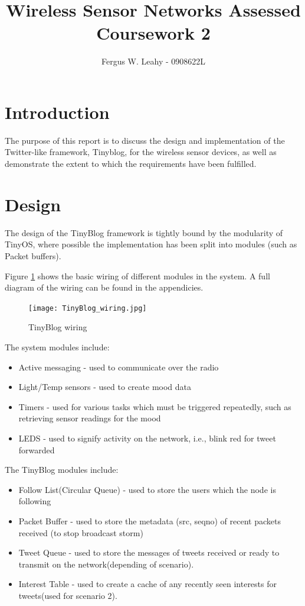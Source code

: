 \documentclass{article}
\author{Fergus W. Leahy - 0908622L}
\title{Wireless Sensor Networks Assessed Coursework 2}
\begin{document}
\maketitle{}

\section{Introduction}
The purpose of this report is to discuss the design and implementation of the Twitter-like framework, Tinyblog, for the wireless sensor devices, as well as demonstrate the extent to which the requirements have been fulfilled.  

\section{Design}
The design of the TinyBlog framework is tightly bound by the modularity of TinyOS, where possible the implementation has been split into modules (such as Packet buffers).

Figure \ref{fig:modules} shows the basic wiring of different modules in the system. A full diagram of the wiring can be found in the appendicies.
\begin{figure}[htb!]
\centering
\texttt{[image: TinyBlog\_wiring.jpg]}
\caption{TinyBlog wiring}
\label{fig:modules}
\end{figure}  

The system modules include: 
\begin{itemize}
	\item Active messaging - used to communicate over the radio
	\item Light/Temp sensors - used to create mood data
	\item Timers - used for various tasks which must be triggered repeatedly, such as retrieving sensor readings for the mood
	\item LEDS - used to signify activity on the network, i.e., blink red for tweet forwarded
\end{itemize}

The TinyBlog modules include:
\begin{itemize}
	\item Follow List(Circular Queue) - used to store the users which the node is following
	\item Packet Buffer - used to store the metadata (src, seqno) of recent packets received (to stop broadcast storm)
	\item Tweet Queue - used to store the messages of tweets received or ready to transmit on the network(depending of scenario).
	\item Interest Table - used to create a cache of any recently seen interests for tweets(used for scenario 2).
\end{itemize}
\end{document}
